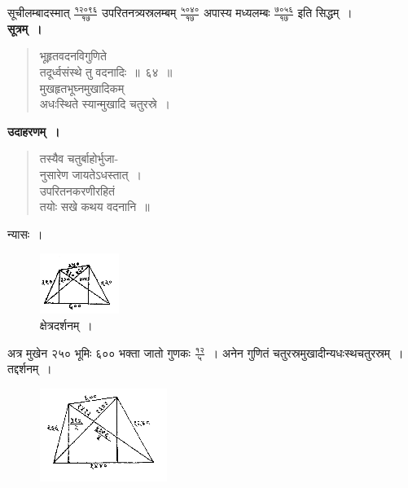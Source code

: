 \documentclass[11pt, openany]{book}
\begin{document}
 सूचीलम्बादस्मात् $\frac{\mbox{१२०९६}}{\mbox{१७}}$ उपरितनत्र्यस्रलम्बम् $\frac{\mbox{५०४०}}{\mbox{१७}}$ अपास्य 
मध्यलम्बः $\frac{\mbox{७०५६}}{\mbox{१७}}$ इति सिद्धम्~। \\

 \textbf{सूत्रम्~।} 
\begin{quote}
    \bs 
     भूहृतवदनविगुणिते \\
     तदूर्ध्वसंस्थे तु वदनादिः~॥~६४~॥\\
मुखहृतभूघ्नमुखादिकम् \\
अधःस्थिते स्यान्मुखादि चतुरस्रे~।
\end{quote}

 \textbf{उदाहरणम्~।} 
\begin{quote}
    \bqt 
     तस्यैव चतुर्बाहोर्भुजा-\\
     नुसारेण जायतेऽधस्तात्~।\\
उपरितनकरणीरहितं \\
तयोः सखे कथय वदनानि~॥
\end{quote}

\newpage

 न्यासः~। 
\begin{figure}[h!]
    \centering
   \captionsetup{labelformat=empty}
  \caption{क्षेत्रदर्शनम्~।}
\vspace{-4mm}

    \includegraphics[scale=0.85]{graphics/capture74.png}
\end{figure}
\vspace{-2mm}

 अत्र मुखेन २५० भूमिः ६०० भक्ता जातो गुणकः $\frac{\mbox{१२}}{\mbox{५}}$~। अनेन
गुणितं चतुरस्रमुखादीन्यधःस्थचतुरस्रम्~। तद्दर्शनम्~। 
\vspace{-2mm}

\begin{figure}[h!]
    \centering
    \includegraphics[scale=0.85]{graphics/capture75.png}
\end{figure}
\vspace{-2mm}
\end{document}
